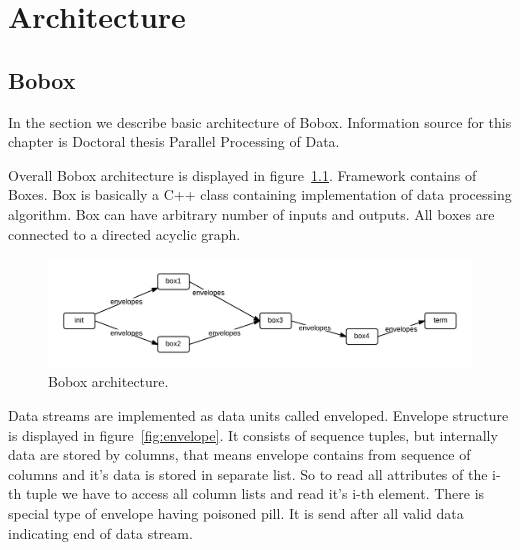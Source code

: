 \chapter{Architecture}

\section{Bobox}

In the section we describe basic architecture of Bobox. Information source for this chapter is Doctoral thesis Parallel Processing of Data\cite{faltthesis}. 

Overall Bobox architecture is displayed in figure~\ref{fig:bobox}. Framework contains of Boxes. Box is basically a C++ class containing implementation of data processing algorithm. Box can have arbitrary number of inputs and outputs. All boxes are connected to a directed acyclic graph.  

\begin{figure}[h!]
  \centering

    \includegraphics[width=1\textwidth]{bobox}
    
      \caption{Bobox architecture.}
        \label{fig:bobox}
\end{figure}

Data streams are implemented as data units called enveloped. Envelope structure is displayed in figure~\ref{fig:envelope}. It consists of sequence tuples, but internally data are stored by columns, that means envelope contains from sequence of columns and it's data is stored in separate list. So to read all attributes of the i-th tuple we have to access all column lists and read it's i-th element. There is special type of envelope having poisoned pill. It is send after all valid data indicating end of data stream. 

